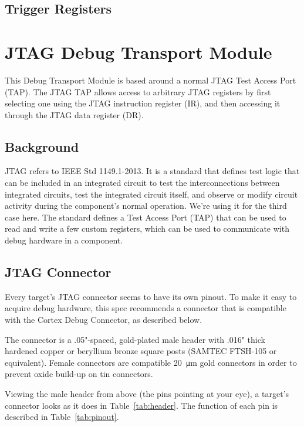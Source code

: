 \documentclass{article}
\begin{document}
\subsection{Trigger Registers}



\section{JTAG Debug Transport Module}

This Debug Transport Module is based around a normal JTAG Test Access Port
(TAP).  The JTAG TAP allows access to arbitrary JTAG registers by first
selecting one using the JTAG instruction register (IR), and then accessing it
through the JTAG data register (DR).

\subsection{Background}

JTAG refers to IEEE Std 1149.1-2013. It is a standard that defines test logic
that can be included in an integrated circuit to test the interconnections
between integrated circuits, test the integrated circuit itself, and observe or
modify circuit activity during the component’s normal operation. We're using it
for the third case here.  The standard defines a Test Access Port (TAP) that
can be used to read and write a few custom registers, which can be used to
communicate with debug hardware in a component.

\subsection{JTAG Connector}

Every target's JTAG connector seems to have its own pinout. To make it easy to
acquire debug hardware, this spec recommends a connector that is compatible
with the Cortex Debug Connector, as described below.

The connector is a .05"-spaced, gold-plated male header with .016" thick
hardened copper or beryllium bronze square posts (SAMTEC FTSH-105 or
equivalent). Female connectors are compatible \SI{20}{\micro\metre} gold
connectors in order to prevent oxide build-up on tin connectors.

Viewing the male header from above (the pins pointing at your eye), a target's
connector looks as it does in Table~\ref{tab:header}. The function of each pin
is described in Table~\ref{tab:pinout}.
\end{document}
